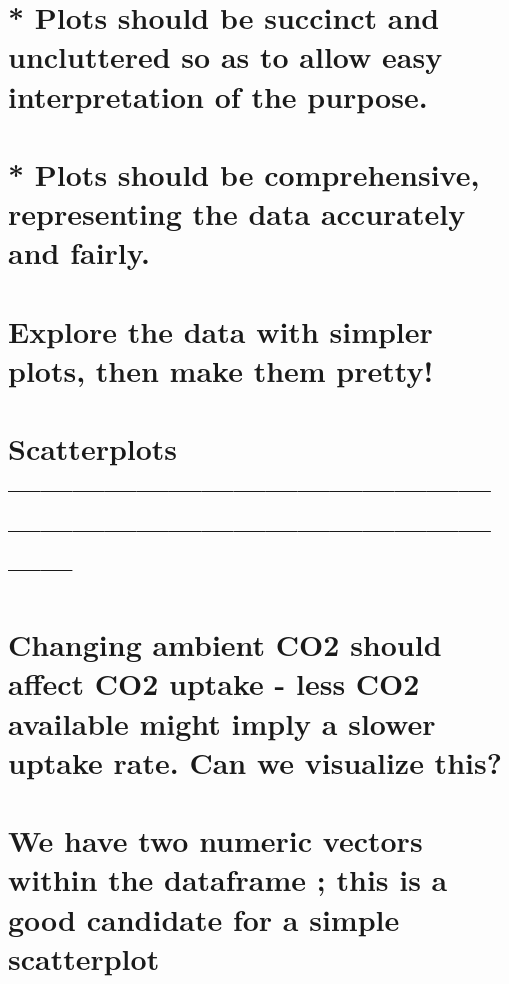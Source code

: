 \documentclass[]{article}
\begin{document}
\hypertarget{plots-should-be-succinct-and-uncluttered-so-as-to-allow-easy-interpretation-of-the-purpose.}{%
\section{* Plots should be succinct and uncluttered so as to allow easy
interpretation of the
purpose.}\label{plots-should-be-succinct-and-uncluttered-so-as-to-allow-easy-interpretation-of-the-purpose.}}

\hypertarget{plots-should-be-comprehensive-representing-the-data-accurately-and-fairly.}{%
\section{* Plots should be comprehensive, representing the data
accurately and
fairly.}\label{plots-should-be-comprehensive-representing-the-data-accurately-and-fairly.}}

\hypertarget{explore-the-data-with-simpler-plots-then-make-them-pretty}{%
\section{Explore the data with simpler plots, then make them
pretty!}\label{explore-the-data-with-simpler-plots-then-make-them-pretty}}

\hypertarget{scatterplots}{%
\section{Scatterplots
------------------------------------------------------------------------------------------------}\label{scatterplots}}

\hypertarget{changing-ambient-co2-should-affect-co2-uptake---less-co2-available-might-imply-a-slower-uptake-rate.-can-we-visualize-this}{%
\section{Changing ambient CO2 should affect CO2 uptake - less CO2
available might imply a slower uptake rate. Can we visualize
this?}\label{changing-ambient-co2-should-affect-co2-uptake---less-co2-available-might-imply-a-slower-uptake-rate.-can-we-visualize-this}}

\hypertarget{we-have-two-numeric-vectors-within-the-dataframe-this-is-a-good-candidate-for-a-simple-scatterplot}{%
\section{We have two numeric vectors within the dataframe ; this is a
good candidate for a simple
scatterplot}\label{we-have-two-numeric-vectors-within-the-dataframe-this-is-a-good-candidate-for-a-simple-scatterplot}}
\end{document}
